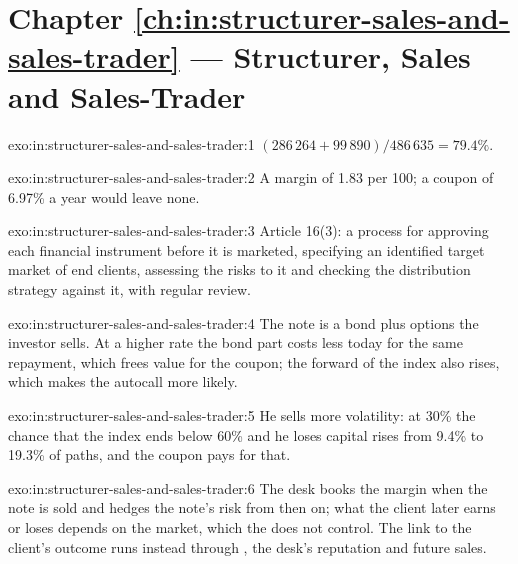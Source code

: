 \section*{Chapter \ref{ch:in:structurer-sales-and-sales-trader} --- Structurer, Sales and Sales-Trader}

\begin{solution}{exo:in:structurer-sales-and-sales-trader:1}
$(286\,264+99\,890)/486\,635=79.4\%$.
\end{solution}

\begin{solution}{exo:in:structurer-sales-and-sales-trader:2}
A margin of 1.83 per 100; a coupon of 6.97\% a year would leave none.
\end{solution}

\begin{solution}{exo:in:structurer-sales-and-sales-trader:3}
Article 16(3): a process for approving each financial instrument before it is marketed, specifying an identified target
market of end clients, assessing the risks to it and checking the distribution strategy against it, with regular review.
\end{solution}

\begin{solution}{exo:in:structurer-sales-and-sales-trader:4}
The note is a bond plus options the investor sells. At a higher rate the bond part costs less today for the same
repayment, which frees value for the coupon; the forward of the index also rises, which makes the autocall more likely.
\end{solution}

\begin{solution}{exo:in:structurer-sales-and-sales-trader:5}
He sells more volatility: at 30\% the chance that the index ends below 60\% and he loses capital rises from 9.4\% to
19.3\% of paths, and the coupon pays for that.
\end{solution}

\begin{solution}{exo:in:structurer-sales-and-sales-trader:6}
The desk books the margin when the note is sold and hedges the note's risk from then on; what the client later earns or
loses depends on the market, which the  does not control. The link to the client's outcome runs instead
through , the desk's reputation and future sales.
\end{solution}


